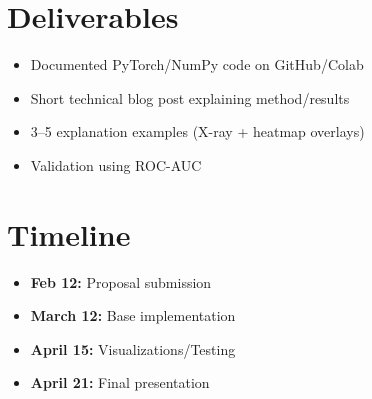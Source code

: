 \documentclass[12pt]{article}
\begin{document}
\section{Deliverables}
\begin{itemize}
    \item Documented PyTorch/NumPy code on GitHub/Colab
    \item Short technical blog post explaining method/results
    \item 3--5 explanation examples (X-ray + heatmap overlays)
    \item Validation using ROC-AUC
\end{itemize}

\section{Timeline}
\begin{itemize}
    \item \textbf{Feb 12:} Proposal submission
    \item \textbf{March 12:} Base implementation
    \item \textbf{April 15:} Visualizations/Testing
    \item \textbf{April 21:} Final presentation
\end{itemize}
\end{document}
